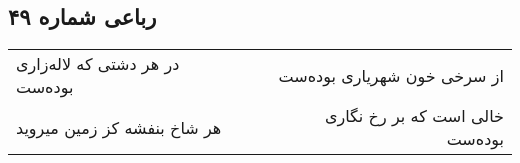 \begin{center}
\section*{رباعی شماره ۴۹}
\label{sec:sh049}
\begin{longtable}{l p{0.5cm} r}
در هر دشتی که لاله‌زاری بوده‌ست
&&
از سرخی خون شهریاری بوده‌ست
\\
هر شاخ بنفشه کز زمین میروید
&&
خالی است که بر رخ نگاری بوده‌ست
\\
\end{longtable}
\end{center}
